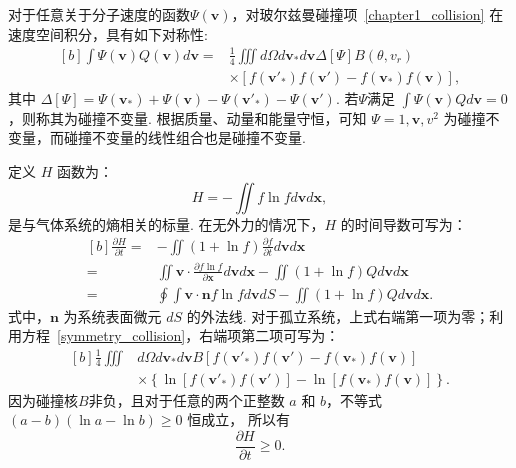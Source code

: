 对于任意关于分子速度的函数$\Psi(\bm{v})$，对玻尔兹曼碰撞项~\eqref{chapter1_collision} 在速度空间积分，具有如下对称性:
\begin{equation}\label{symmetry_collision}
\begin{aligned}[b]
\int\Psi(\bm{v})Q(\bm{v})d\bm{v}=&\frac{1}{4}\iiint d\Omega
d\bm{v}_\ast{d\bm{v}}
\Delta[\Psi]
B(\theta,v_r)\\
&\times \left[f(\bm{v}'_{\ast})f(\bm{v}')-f(\bm{v}_{\ast})f(\bm{v})\right],
\end{aligned}
\end{equation}
其中
$\Delta[\Psi]=
\Psi(\bm{v}_{\ast})+\Psi(\bm{v})
-\Psi(\bm{v}'_{\ast})-\Psi(\bm{v}')$. 
若$\Psi$满足 $\int\Psi(\bm{v})Qd\bm{v}=0$，则称其为碰撞不变量. 根据质量、动量和能量守恒，可知 $\Psi=1,\bm{v}, v^2$ 为碰撞不变量，而碰撞不变量的线性组合也是碰撞不变量. 

定义 $H$ 函数为：
\begin{equation}\label{entropy_function}
H=-\iint {f\ln}fd\bm{v}d\bm{x},
\end{equation}
是与气体系统的熵相关的标量.  在无外力的情况下，$H$ 的时间导数可写为：
\begin{equation*}
\begin{aligned}[b]
\frac{\partial H}{\partial t}=&	-\iint(1+{\ln}f)\frac{\partial{f}}{\partial{t}}d\bm{v}d\bm{x}\\
=&\iint{\bm{v}\cdot\frac{\partial{f}\ln{f}}{\partial\bm{x}}}d\bm{v}d\bm{x}-\iint(1+\ln{f}){Q} d\bm{v}d\bm{x}\\
=&\oint \int{\bm{v}\cdot\bm{n} {f}\ln{f}}d\bm{v}dS-\iint(1+\ln{f}){Q} d\bm{v}d\bm{x}.
\end{aligned}
\end{equation*}
式中，$\bm{n}$ 为系统表面微元 $dS$ 的外法线.  对于孤立系统，上式右端第一项为零；利用方程~\eqref{symmetry_collision}，右端项第二项可写为：
\begin{equation*}
\begin{aligned}[b]
\frac{1}{4}\iiint{}&d\Omega
d\bm{v}_\ast{d\bm{v}}
B
\left[f(\bm{v}'_{\ast})f(\bm{v}')-f(\bm{v}_{\ast})f(\bm{v})\right]\\
&\times
\left\{
\ln[f(\bm{v}'_{\ast})f(\bm{v}')]
-\ln[f(\bm{v}_{\ast})f(\bm{v})]
\right\}.
\end{aligned}
\end{equation*}
因为碰撞核$B$非负，且对于任意的两个正整数 $a$ 和 $b$，不等式 $(a-b)(\ln{a}-\ln{b})\ge0$ 恒成立， 所以有
\begin{equation}\label{entropy_inequality}
\frac{\partial H}{\partial t}\ge0.
\end{equation}

